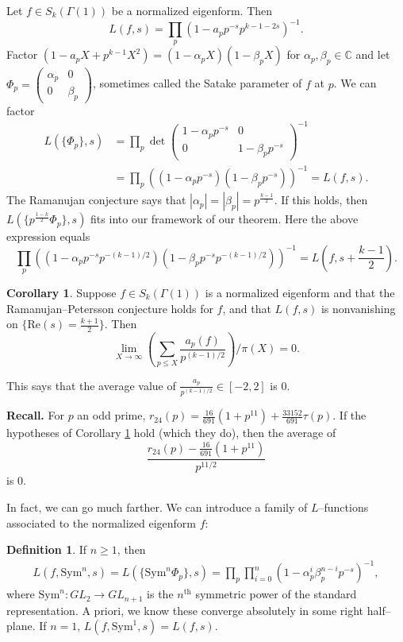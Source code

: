 \documentclass{article}
\theoremstyle{definition}
\newtheorem{cor}[theorem]{Corollary}
\newtheorem{defn}{Definition}[section]
\begin{document}
Let $f \in S_k(\Gamma(1))$ be a normalized eigenform. Then $$L(f,s) = \prod_{p}^{} (1-a_p p^{-s} p^{k-1-2s})^{-1}.$$ Factor $(1-a_p X + p^{k-1}X^2) = (1-\alpha_p X)(1- \beta_p X)$ for $\alpha_p,\beta_p \in \mathbb{C}$ and let $\Phi_p = \begin{pmatrix} \alpha_p & 0\\ 0 &\beta_p \end{pmatrix}$, sometimes called the Satake parameter of $f$ at $p$. We can factor
\begin{align*}
    L(\{\Phi_p\},s) &= \prod_{p}^{} \det \begin{pmatrix} 1-\alpha_p p^{-s} & 0 \\ 0 & 1 - \beta_p p^{-s} \end{pmatrix}^{-1} \\
    &= \prod_{p}^{} ((1-\alpha_p p^{-s})(1-\beta_p p^{-s}))^{-1} = L(f,s).
\end{align*}
The Ramanujan conjecture says that $|\alpha_p|=|\beta_p|=p^{\frac{k-1}{2}}$. If this holds, then $L(\{p^{\frac{1-k}{2}}\Phi_p\},s)$ fits into our framework of our theorem. Here the above expression equals $$\prod_{p}^{} ((1 - \alpha_p p^{-s} p ^{-(k-1)/2})(1 - \beta_p p^{-s} p^{-(k-1)/2}))^{-1} = L\left(f,s+\frac{k-1}{2}\right).$$

\begin{cor}\label{cor4.9}
    Suppose $f \in S_k(\Gamma(1))$ is a normalized eigenform and that the Ramanujan--Petersson conjecture holds for $f$, and that $L(f,s)$ is nonvanishing on $\{\text{Re}(s)=\frac{k+1}{2}\}$. Then \[
    \lim_{X \to \infty} \left(\sum_{p\le X}^{} \frac{a_p(f)}{p^{(k-1)/2}}\right)/\pi(X) = 0.
    \]
\end{cor}
This says that the average value of $\frac{a_p}{p^{(k-1)/2}} \in [-2,2]$ is 0.
\vspace{1mm}
 
\textbf{Recall.} For $p$ an odd prime, $r_{24}(p) = \frac{16}{691}(1+p^{11})+\frac{33152}{691}\tau(p)$. If the hypotheses of Corollary \ref{cor4.9} hold (which they do), then the average of $$\frac{r_{24}(p)-\frac{16}{691}(1+p^{11})}{p^{11/2}}$$ is 0. 
\vspace{1mm}
 
In fact, we can go much farther. We can introduce a family of $L$--functions associated to the normalized eigenform $f$: 
\begin{defn}
    If $n\ge 1$, then 
    \begin{align*}
        L(f, \text{Sym}^n, s) = L(\{\text{Sym}^n \Phi_p\}, s) = \prod_{p}^{} \prod_{i=0}^{n} (1 - \alpha_p^i \beta_p^{n-i}p^{-s})^{-1},
    \end{align*}
    where $\text{Sym}^n : GL_2 \to GL_{n+1}$ is the $n^{\text{th}}$ symmetric power of the standard representation. A priori, we know these converge absolutely in some right half--plane. If $n=1$, $L(f, \text{Sym}^1, s) = L(f,s)$.
\end{defn}
\end{document}
